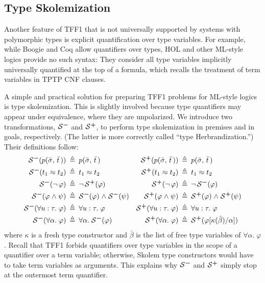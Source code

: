 \subsection{Type Skolemization} \label{ssec:skol}

Another feature of TFF1 that is not universally supported
by systems with polymorphic types is explicit
quantification over type variables.
For example, while Boogie \cite{leino-ruemmer-2010} and Coq \cite{bertot-casteran-2004}
allow quantifiers over types, %
HOL and other ML-style logics provide no such syntax:
They consider all type variables
implicitly universally quantified at the top of a formula, which
recalls the treatment of term variables in TPTP CNF clauses.

A simple and practical solution for preparing TFF1 problems
for ML-style logics is type skolemization. This is slightly involved because
type quantifiers may appear under equivalence, where they are unpolarized.
%
We introduce two transformations, $\SKOM$ and $\mathcal{S}\text{\textsuperscript{\kern.1ex\bfseries+}}$, to perform type
skolemization in premises and in goals, respectively. (The latter is more
correctly called ``type Herbrandization.'')
Their definitions follow:
\begin{align*}
\SKOM(p(\bar{\sigma},\,\bar{t}\,)) &\eqdef p(\bar{\sigma},\,\bar{t}\,) &
\SKOP(p(\bar{\sigma},\,\bar{t}\,)) &\eqdef p(\bar{\sigma},\,\bar{t}\,) \\
\SKOM(t_1 \eq t_2) &\eqdef t_1 \eq t_2 &
\SKOP(t_1 \eq t_2) &\eqdef t_1 \eq t_2 \\
\SKOM(\lnot\, \varphi) &\eqdef \lnot\, \SKOP(\varphi) &
\SKOP(\lnot\, \varphi) &\eqdef \lnot\, \SKOM(\varphi) \\
\SKOM(\varphi \rand \psi) &\eqdef \SKOM(\varphi) \rand \SKOM(\psi) &
\SKOP(\varphi \rand \psi) &\eqdef \SKOP(\varphi) \rand \SKOP(\psi) \\
\SKOM(\forall u \ty \tau .\; \varphi) &\eqdef \forall u \ty \tau .\; \varphi &
\SKOP(\forall u \ty \tau .\; \varphi) &\eqdef \forall u \ty \tau .\; \varphi \\
\SKOM(\forall \alpha .\; \varphi) &\eqdef \forall \alpha .\; \SKOM(\varphi) &
\SKOP(\forall \alpha .\; \varphi) &\eqdef
\SKOP(\varphi[\kappa(\bar\beta)/\alpha])
\end{align*}
where $\kappa$ is a fresh type constructor and $\bar\beta$ is the list of free
type variables of $\forall \alpha .\; \varphi$.
Recall that TFF1 forbids quantifiers over type variables in the scope
of a quantifier over a term variable; otherwise, Skolem type constructors
would have to take term variables as arguments. This explains why $\SKOM$ and
$\mathcal{S}\text{\textsuperscript{\kern.1ex\bfseries+}}$ simply stop at the outermost term quantifier.

